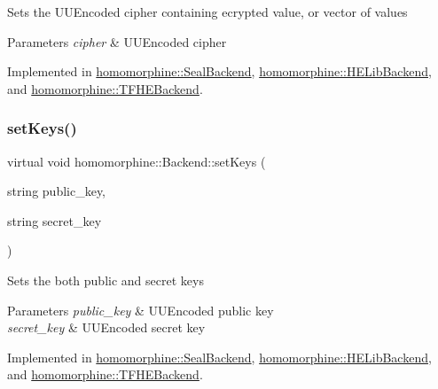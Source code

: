 Sets the U\+U\+Encoded cipher containing ecrypted value, or vector of values


\begin{DoxyParams}{Parameters}
{\em cipher} & U\+U\+Encoded cipher \\
\hline
\end{DoxyParams}


Implemented in \mbox{\hyperlink{classhomomorphine_1_1_seal_backend_a866b58e41809d68d4c6ed8c3afb27712}{homomorphine\+::\+Seal\+Backend}}, \mbox{\hyperlink{classhomomorphine_1_1_h_e_lib_backend_a5baa6ad05fbb23d27c4ec4bb018a8c64}{homomorphine\+::\+H\+E\+Lib\+Backend}}, and \mbox{\hyperlink{classhomomorphine_1_1_t_f_h_e_backend_a8f202969536944390cf28faf4642287b}{homomorphine\+::\+T\+F\+H\+E\+Backend}}.

\mbox{\label{classhomomorphine_1_1_backend_a48558b9cf1c143d92d83fa095dd84413}} 
\subsubsection{\texorpdfstring{setKeys()}{setKeys()}}
{\footnotesize\ttfamily virtual void homomorphine\+::\+Backend\+::set\+Keys (\begin{DoxyParamCaption}\item[{string}]{public\+\_\+key,  }\item[{string}]{secret\+\_\+key }\end{DoxyParamCaption})\hspace{0.3cm}{\ttfamily [pure virtual]}}

Sets the both public and secret keys


\begin{DoxyParams}{Parameters}
{\em public\+\_\+key} & U\+U\+Encoded public key \\
\hline
{\em secret\+\_\+key} & U\+U\+Encoded secret key \\
\hline
\end{DoxyParams}


Implemented in \mbox{\hyperlink{classhomomorphine_1_1_seal_backend_a42afcc2823d616edc6be0e3950cf7196}{homomorphine\+::\+Seal\+Backend}}, \mbox{\hyperlink{classhomomorphine_1_1_h_e_lib_backend_a2980c8eaf3556057aac364a1e61ab8cd}{homomorphine\+::\+H\+E\+Lib\+Backend}}, and \mbox{\hyperlink{classhomomorphine_1_1_t_f_h_e_backend_a7492d3614afaf3c082ce71422ac8f013}{homomorphine\+::\+T\+F\+H\+E\+Backend}}.

